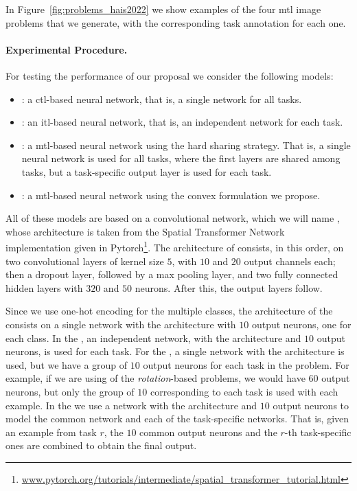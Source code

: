 In Figure~\ref{fig:problems_hais2022} we show examples of the four \acrshort{mtl} image problems that we generate, with the corresponding task annotation for each one.



\paragraph*{Experimental Procedure.\\}
For testing the performance of our proposal we consider the following models:
\begin{itemize}
    \item {}: a \acrshort{ctl}-based neural network, that is, a single network for all tasks.
    \item {}: an \acrshort{itl}-based neural network, that is, an independent network for each task.
    \item {}: a \acrshort{mtl}-based neural network using the hard sharing strategy. That is, a single neural network is used for all tasks, where the first layers are shared among tasks, but a task-specific output layer is used for each task.
    \item {}: a \acrshort{mtl}-based neural network using the convex formulation we propose.
\end{itemize}
All of these models are based on a convolutional network, which we will name , whose architecture is taken from the Spatial Transformer Network~\citep{Jaderberg_2015} implementation given in Pytorch\footnote{\href{www.pytorch.org/tutorials/intermediate/spatial\_transformer\_tutorial.html}{www.pytorch.org/tutorials/intermediate/spatial\_transformer\_tutorial.html}}.
The architecture of  consists, in this order, on two convolutional layers of kernel size $5$, with $10$ and $20$ output channels each; then a dropout layer, followed by a max pooling layer, and two fully connected hidden layers with $320$ and $50$ neurons. After this, the output layers follow.

%
Since we use one-hot encoding for the multiple classes, the architecture of the  consists on a single network with the  architecture with $10$ output neurons, one for each class.
%
In the , an independent network, with the  architecture and $10$ output neurons, is used for each task.
%
For the , a single network with the  architecture is used, but we have a group of $10$ output neurons for each task in the problem. For example, if we are using of the \emph{rotation}-based problems, we would have $60$ output neurons, but only the group of $10$ corresponding to each task is used with each example.
%
In the  we use a network with the  architecture and $10$ output neurons to model the common network and each of the task-specific networks. That is, given an example from task $r$, the $10$ common output neurons and the  $r$-th task-specific ones are combined to obtain the final output. 

